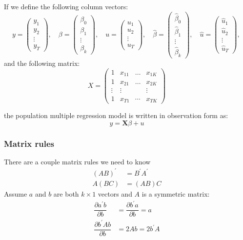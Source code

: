 \documentclass[11pt]{article}
\begin{document}
If we define the following column vectors:
\begin{equation}
y=\left(\begin{array}{c}
y_1 \\
y_2 \\
\vdots \\
y_T
\end{array}\right), \quad \beta=\left(\begin{array}{c}
\beta_0 \\
\beta_1 \\
\vdots \\
\beta_k
\end{array}\right), \quad u=\left(\begin{array}{c}
u_1 \\
u_2 \\
\vdots \\
u_T
\end{array}\right), \quad \widehat{\beta}=\left(\begin{array}{c}
\widehat{\beta}_0 \\
\widehat{\beta}_1 \\
\vdots \\
\widehat{\beta}_k
\end{array}\right), \quad \widehat{u}=\left(\begin{array}{c}
\widehat{u}_1 \\
\widehat{u}_2 \\
\vdots \\
\widehat{u}_T
\end{array}\right) \text {, }
\end{equation}
and the following matrix:
\begin{equation}
X=\left(\begin{array}{cccc}
1 & x_{11} & \ldots & x_{1 K} \\
1 & x_{21} & \ldots & x_{2 K} \\
\vdots & \vdots & & \vdots \\
1 & x_{T 1} & \cdots & x_{T K}
\end{array}\right)
\end{equation}

the population multiple regression model is written in observation form as:
\begin{equation}
    y = \boldsymbol{X}\beta + u
\end{equation}

\subsubsection{Matrix rules}
There are a couple matrix rules we need to know
\begin{align*}
    (AB)^\prime &= B^\prime A^\prime \\
    A(BC) &= (AB)C
\end{align*}
Assume $a$ and $b$ are both $k\times 1$ vectors and $A$ is a symmetric matrix:
\begin{align}
    \dfrac{\partial a^\prime b}{\partial b} &= \dfrac{\partial b^\prime a}{\partial b} = a \\
    \dfrac{\partial b^\prime Ab}{\partial b} &= 2Ab = 2b^\prime A
\end{align}
\end{document}

